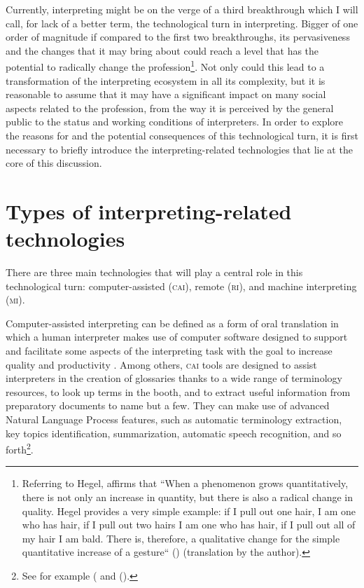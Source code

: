 \documentclass[output=paper]{langsci/langscibook}
\begin{document}
Currently, interpreting might be on the verge of a third breakthrough which I will call, for lack of a better term, the technological turn in interpreting. Bigger of one order of magnitude if compared to the first two breakthroughs, its pervasiveness and the changes that it may bring about could reach a level that has the potential to radically change the profession\footnote{Referring to Hegel, \citeauthor{galimberti_i_2009} affirms that “When a phenomenon grows quantitatively, there is not only an increase in quantity, but there is also a radical change in quality. Hegel provides a very simple example: if I pull out one hair, I am one who has hair, if I pull out two hairs I am one who has hair, if I pull out all of my hair I am bald. There is, therefore, a qualitative change for the simple quantitative increase of a gesture“ (\citeyear{galimberti_i_2009}) (translation by the author).}. Not only could this lead to a transformation of the interpreting ecosystem in all its complexity, but it is reasonable to assume that it may have a significant impact on many social aspects related to the profession, from the way it is perceived by the general public to the status and working conditions of interpreters. In order to explore the reasons for and the potential consequences of this technological turn, it is first necessary to briefly introduce the interpreting-related technologies that lie at the core of this discussion. 
 
\section{Types of interpreting-related technologies} 
There are three main technologies that will play a central role in this technological turn: computer-assisted (\textsc{cai}), remote (\textsc{ri}), and machine interpreting (\textsc{mi}). 
 
Computer-assisted interpreting can be defined as a form of oral translation in which a human interpreter makes use of computer software designed to support and facilitate some aspects of the interpreting task with the goal to increase quality and productivity \citep{Fantinuoli2018}. Among others, \textsc{cai} tools are designed to assist interpreters in the creation of glossaries thanks to a wide range of terminology resources, to look up terms in the booth, and to extract useful information from preparatory documents to name but a few. They can make use of advanced Natural Language Process features, such as automatic terminology extraction, key topics identification, summarization, automatic speech recognition, and so forth\footnote{See for example \citeauthor{fantinuoli_speech_2017} (\citeyear{fantinuoli_speech_2017} and \citeauthor{stewart_automatic_2018)} ().}. 
 
\end{document}
